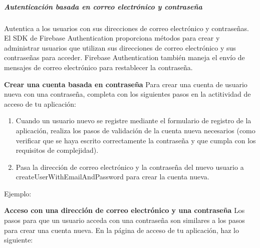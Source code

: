 \subparagraph{Autenticación basada en correo electrónico y contraseña}
\label{\detokenize{firebase_web:autenticacion-basada-en-correo-electronico-y-contrasena}}
Autentica a los usuarios con sus direcciones de correo electrónico y contraseñas. El SDK de Firebase Authentication proporciona métodos para crear y administrar usuarios que utilizan sus direcciones de correo electrónico y sus contraseñas para acceder. Firebase Authentication también maneja el envío de mensajes de correo electrónico para restablecer la contraseña.


\textbf{Crear una cuenta basada en contraseña}
\label{\detokenize{firebase_web:crear-una-cuenta-basada-en-contrasena}}
Para crear una cuenta de usuario nueva con una contraseña, completa con los
siguientes pasos en la actitividad de acceso de tu aplicación:
\begin{enumerate}
\item {} 
Cuando un usuario nuevo se registre mediante el formulario de registro de la aplicación, realiza los pasos de validación de la cuenta nueva necesarios (como verificar que se haya escrito correctamente la contraseña y que cumpla con los requisitos de complejidad).

\item {} 
Pasa la dirección de correo electrónico y la contraseña del nuevo usuario a createUserWithEmailAndPassword para crear la cuenta nueva.

\end{enumerate}

Ejemplo:

%
\begin{sphinxVerbatim}[commandchars=\\\{\}]
  
        
     
     
\end{sphinxVerbatim}


\textbf{Acceso con una dirección de correo electrónico y una contraseña}
\label{\detokenize{firebase_web:acceso-con-una-direccion-de-correo-electronico-y-una-contrasena}}
Los pasos para que un usuario acceda con una contraseña son similares a los pasos para crear una cuenta nueva. En la página de acceso de tu aplicación, haz lo siguiente:


